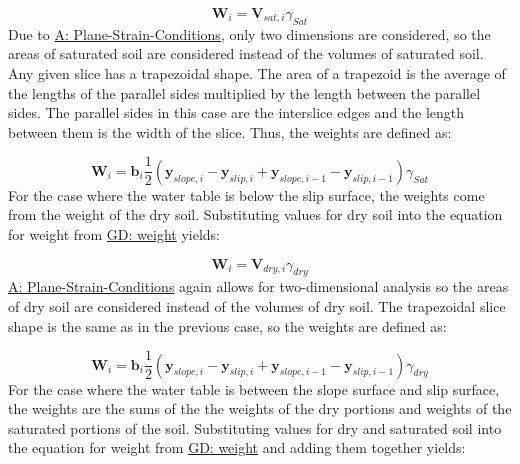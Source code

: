 \documentclass[12pt]{article}
\begin{document}
\begin{displaymath}
{\mathbf{W}}_{i}={\mathbf{V}_{sat,i}} {γ_{Sat}}
\end{displaymath}
Due to \hyperref[assumpPSC]{A: Plane-Strain-Conditions}, only two dimensions are considered, so the areas of saturated soil are considered instead of the volumes of saturated soil. Any given slice has a trapezoidal shape. The area of a trapezoid is the average of the lengths of the parallel sides multiplied by the length between the parallel sides. The parallel sides in this case are the interslice edges and the length between them is the width of the slice. Thus, the weights are defined as:

\begin{displaymath}
{\mathbf{W}}_{i}={\mathbf{b}}_{i} \frac{1}{2} \left({\mathbf{y}_{slope,i}}-{\mathbf{y}_{slip,i}}+{\mathbf{y}_{slope,i-1}}-{\mathbf{y}_{slip,i-1}}\right) {γ_{Sat}}
\end{displaymath}
For the case where the water table is below the slip surface, the weights come from the weight of the dry soil. Substituting values for dry soil into the equation for weight from \hyperref[GD:weight]{GD: weight} yields:

\begin{displaymath}
{\mathbf{W}}_{i}={\mathbf{V}_{dry,i}} {γ_{dry}}
\end{displaymath}
\hyperref[assumpPSC]{A: Plane-Strain-Conditions} again allows for two-dimensional analysis so the areas of dry soil are considered instead of the volumes of dry soil. The trapezoidal slice shape is the same as in the previous case, so the weights are defined as:

\begin{displaymath}
{\mathbf{W}}_{i}={\mathbf{b}}_{i} \frac{1}{2} \left({\mathbf{y}_{slope,i}}-{\mathbf{y}_{slip,i}}+{\mathbf{y}_{slope,i-1}}-{\mathbf{y}_{slip,i-1}}\right) {γ_{dry}}
\end{displaymath}
For the case where the water table is between the slope surface and slip surface, the weights are the sums of the the weights of the dry portions and weights of the saturated portions of the soil. Substituting values for dry and saturated soil into the equation for weight from \hyperref[GD:weight]{GD: weight} and adding them together yields:
\end{document}
